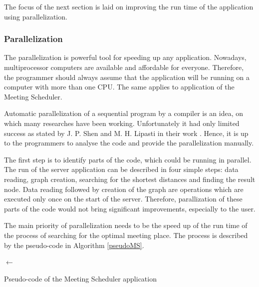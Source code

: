 \documentclass[thesis=M,english]{FITthesis}[2012/10/20]
\begin{document}
The focus of the next section is laid on improving the run time of the application using parallelization.

\subsubsection{Parallelization}
\label{sec:real_parallelization}
The parallelization is powerful tool for speeding up any application. Nowadays, multiprocessor computers are available and affordable for everyone. Therefore, the programmer should always assume that the application will be running on a computer with more than one CPU. The same applies to application of the Meeting Scheduler.

Automatic parallelization of a sequential program by a compiler is an idea, on which many researches have been working. Unfortunately it had only limited success as stated by J. P. Shen and M. H. Lipasti in their work \cite{Shen04}. Hence, it is up to the programmers to analyse the code and provide the parallelization manually.

The first step is to identify parts of the code, which could be running in parallel. The run of the server application can be described in four simple steps: data reading, graph creation, searching for the shortest distances and finding the result node. Data reading followed by creation of the graph are operations which are executed only once on the start of the server. Therefore, parallization of these parts of the code would not bring significant improvements, especially to the user. 

The main priority of parallelization needs to be the speed up of the run time of the process of searching for the optimal meeting place.
The process is described by the pseudo-code in Algorithm \ref{pseudoMS}.

\begin{algorithm}[H]

\BlankLine
\DA $\leftarrow$ \CreateDA{\G}\;

\Return{\RN}
\caption{Pseudo-code of the Meeting Scheduler application}
\label{pseudoMS}
\end{algorithm}
\bigskip
\end{document}
